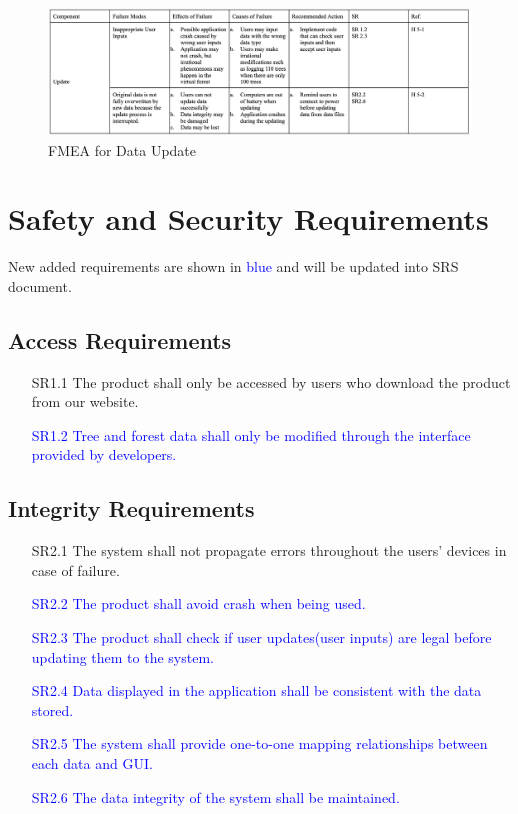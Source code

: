 \documentclass{article}
\begin{document}
\begin{figure}[H]
\begin{flushleft}
\begin{center}
    \includegraphics[scale = 0.55]{HA_Pictures/Update.png}
\end{center}
    \caption{FMEA for Data Update}
    \end{flushleft}
\end{figure}

\newpage

\section{Safety and Security Requirements}

New added requirements are shown in \textcolor{blue}{blue} and will be
updated into SRS document. 

\subsection{Access Requirements}
\begin{enumerate}
    \item[SR1.1] The product shall only be accessed by users who download the product from our website.
    \item[\textcolor{blue}{SR1.2}] \textcolor{blue}{Tree and forest
    data shall only be modified through the interface provided by developers.}
\end{enumerate}

\subsection{Integrity Requirements}
\begin{enumerate}
    \item[SR2.1] The system shall not propagate errors throughout the users' devices in case of failure.
    \item[\textcolor{blue}{SR2.2}] \textcolor{blue}{The product shall avoid crash when being used.}
    \item[\textcolor{blue}{SR2.3}] \textcolor{blue}{The product shall check if user
    updates(user inputs) are legal before updating them to the system.}
    \item[\textcolor{blue}{SR2.4}] \textcolor{blue}{Data displayed in the application shall be consistent with the data stored.}
    \item[\textcolor{blue}{SR2.5}] \textcolor{blue}{The system shall provide one-to-one mapping relationships between each data and GUI.}
    \item[\textcolor{blue}{SR2.6}] \textcolor{blue}{The data integrity of the system shall be maintained.}
\end{enumerate}
\end{document}
